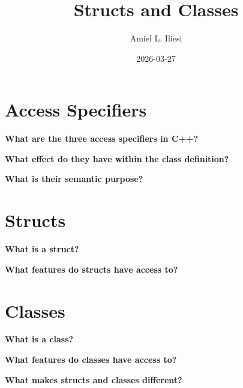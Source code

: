 \documentclass[12pt, letterpaper]{article}
\title{Structs and Classes}
\author{Amiel L. Iliesi}
\date{2026-03-27}
\newcommand{\question}[2][4em]{\textbf{#2}\vspace{#1}\par}
\begin{document}
\maketitle

\tableofcontents

\pagebreak
\section{Access Specifiers}

\question[8em]{What are the three access specifiers in C++?}

\question[8em]{What effect do they have within the class definition?}

\question{What is their semantic purpose?}

\pagebreak
\section{Structs}

\question{What is a struct?}

\question{What features do structs have access to?}

\pagebreak
\section{Classes}

\question{What is a class?}

\question{What features do classes have access to?}

\question{What makes structs and classes different?}
\end{document}
